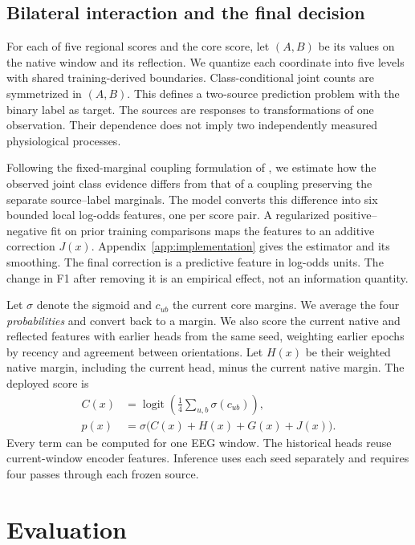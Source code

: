 \documentclass{article}
\newcommand{\logit}{\operatorname{logit}}
\begin{document}
\subsection{Bilateral interaction and the final decision}
For each of five regional scores and the core score, let $(A,B)$ be its values on the native window and its reflection. We quantize each coordinate into five levels with shared training-derived boundaries. Class-conditional joint counts are symmetrized in $(A,B)$. This defines a two-source prediction problem with the binary label as target. The sources are responses to transformations of one observation. Their dependence does not imply two independently measured physiological processes.

Following the fixed-marginal coupling formulation of \citet{bert2014}, we estimate how the observed joint class evidence differs from that of a coupling preserving the separate source--label marginals. The model converts this difference into six bounded local log-odds features, one per score pair. A regularized positive--negative fit on prior training comparisons maps the features to an additive correction $J(x)$. Appendix~\ref{app:implementation} gives the estimator and its smoothing. The final correction is a predictive feature in log-odds units. The change in F1 after removing it is an empirical effect, not an information quantity.

Let $\sigma$ denote the sigmoid and $c_{ub}$ the current core margins. We average the four \emph{probabilities} and convert back to a margin. We also score the current native and reflected features with earlier heads from the same seed, weighting earlier epochs by recency and agreement between orientations. Let $H(x)$ be their weighted native margin, including the current head, minus the current native margin. The deployed score is
\begin{align}
C(x)&=\logit\!\left(\tfrac14\sum_{u,b}\sigma(c_{ub})\right),\\
p(x)&=\sigma\big(C(x)+H(x)+G(x)+J(x)\big). \label{eq:full}
\end{align}
Every term can be computed for one EEG window. The historical heads reuse current-window encoder features. Inference uses each seed separately and requires four passes through each frozen source.

\section{Evaluation}
\end{document}
